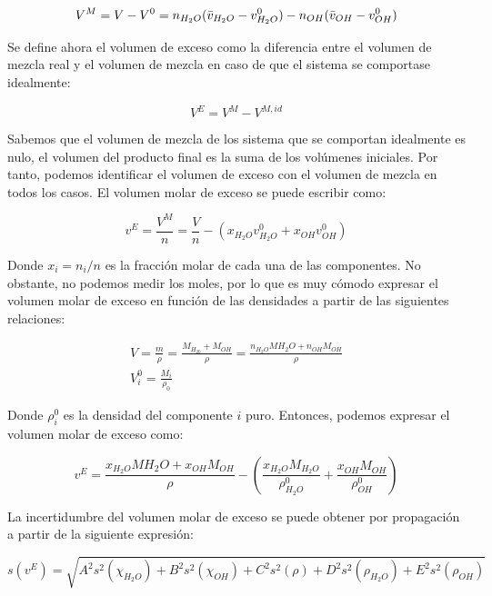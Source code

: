 \documentclass[a4paper,12pt,titlepage]{article}
\begin{document}
\begin{equation}
    V^M = V-V^0= n_{H_2O}(\Bar{v}_{H_2O}-v_{H_2O}^0) - n_{OH}(\Bar{v}_{OH}-v_{OH}^0)
\end{equation}

Se define ahora el volumen de exceso como la diferencia entre el volumen de mezcla real y el volumen de mezcla en caso de que el sistema se comportase idealmente:

\begin{equation}
    V^{E} = V^M - V^{M,id}
\end{equation}

Sabemos que el volumen de mezcla de los sistema que se comportan idealmente es nulo, el volumen del producto final es la suma de los volúmenes iniciales. Por tanto, podemos identificar el volumen de exceso con el volumen de mezcla en todos los casos. El volumen molar de exceso se puede escribir como:

\begin{equation}
    v^{E} = \frac{V^M}{n} = \frac{V}{n} - (x_{H_2O}v_{H_2O}^0 + x_{OH}v_{OH}^0)
\end{equation}

Donde $x_i=n_i/n$ es la fracción molar de cada una de las componentes. No obstante, no podemos medir los moles, por lo que es muy cómodo expresar el volumen molar de exceso en función de las densidades a partir de las siguientes relaciones:

\begin{equation}
    \begin{gathered}
        V=\frac{m}{\rho} = \frac{M_{H_20} + M_{OH}}{\rho} = \frac{n_{H_2O}M{H_2O} + n_{OH}M_{OH}}{\rho} \\
        V_i^0 = \frac{M_i}{\rho_0}
    \end{gathered}
\end{equation}

Donde $\rho^0_i$ es la densidad del componente $i$ puro. Entonces, podemos expresar el volumen molar de exceso como:

\begin{equation}
    v^{E} = \frac{x_{H_2O}M{H_2O} + x_{OH}M_{OH}}{\rho} - \left( \frac{x_{H_2O}M_{H_2O}}{\rho_{H_2O}^0} + \frac{x_{OH}M_{OH}}{\rho_{OH}^0} \right)
\end{equation}

La incertidumbre del volumen molar de exceso se puede obtener por propagación a partir de la siguiente expresión:

\begin{equation}
    s(v^{E}) = \sqrt{A^2 s^2(\chi_{H_2O}) + B^2 s^2(\chi_{OH}) + C^2 s^2(\rho) + D^2 s^2(\rho_{H_2O}) + E^2 s^2(\rho_{OH})}
    \label{s_vE}
\end{equation}
\end{document}
